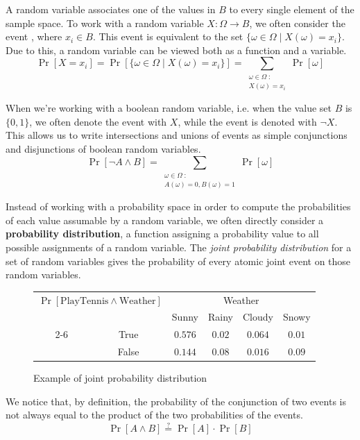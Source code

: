 \documentclass[a4paper, 12pt]{report}
\begin{document}
    A random variable associates one of the values in $B$ to every single element of the sample space. To work with a random variable $X : \Omega \to B$, we often consider the event , where $x_i \in B$. This event is equivalent to the set $\{\omega \in \Omega \mid X(\omega) = x_i\}$. Due to this, a random variable can be viewed both as a function and a variable.
    \[\Pr[X = x_i] = \Pr[\{\omega \in \Omega \mid X(\omega) = x_i\}] = \sum_{\substack{\omega \in \Omega \; :\\ X(\omega) = x_i}} \Pr[\omega]\]

    When we're working with a boolean random variable, i.e. when the value set $B$ is $\{0,1\}$, we often denote the event  with $X$, while the event  is denoted with $\lnot X$. This allows us to write intersections and unions of events as simple conjunctions and disjunctions of boolean random variables.
    \[\Pr[\lnot A \land B] = \sum_{\substack{\omega \in \Omega \;:\\ A(\omega) = 0, B(\omega) = 1}} \Pr[\omega]\]

    Instead of working with a probability space in order to compute the probabilities of each value assumable by a random variable, we often directly consider a \textbf{probability distribution}, a function assigning a probability value to all possible assignments of a random variable. The \textit{joint probability distribution} for a set of random variables gives the probability of every atomic joint event on those random variables.
    \begin{figure}[H]
        \centering
        \begin{tabular}{cc|cccc}
            \multicolumn{2}{c}{$\Pr[\mathrm{PlayTennis} \land \mathrm{Weather}]$} & \multicolumn{4}{c}{Weather} \\
            & & Sunny & Rainy & Cloudy & Snowy \\
            \cline{2-6}
            \multirow{2}{*}{PlayTennis} & True & $0.576$ & $0.02$ & $0.064$ & $0.01$ \\
            & False &$0.144 $ & $0.08 $ & $0.016 $ & $0.09$
        \end{tabular}
        \caption{Example of joint probability distribution}
    \end{figure}

    We notice that, by definition, the probability of the conjunction of two events is not always equal to the product of the two probabilities of the events.
    \[\Pr[A \land B] \stackrel{?}{=} \Pr[A] \cdot \Pr[B]\]
    
\end{document}
